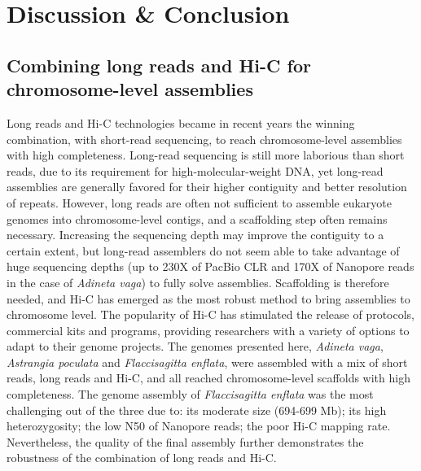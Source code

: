 \chapter{Discussion \& Conclusion}

\section{Combining long reads and Hi-C for chromosome-level assemblies}

Long reads and Hi-C technologies became in recent years the winning combination, with short-read sequencing, to reach chromosome-level assemblies with high completeness. Long-read sequencing is still more laborious than short reads, due to its requirement for high-molecular-weight DNA, yet long-read assemblies are generally favored for their higher contiguity and better resolution of repeats. However, long reads are often not sufficient to assemble eukaryote genomes into chromosome-level contigs, and a scaffolding step often remains necessary. Increasing the sequencing depth may improve the contiguity to a certain extent, but long-read assemblers do not seem able to take advantage of huge sequencing depths (up to 230X of PacBio CLR and 170X of Nanopore reads in the case of \textit{Adineta vaga}) to fully solve assemblies. Scaffolding is therefore needed, and Hi-C has emerged as the most robust method to bring assemblies to chromosome level. The popularity of Hi-C has stimulated the release of protocols, commercial kits and programs, providing researchers with a variety of options to adapt to their genome projects. The genomes presented here, \textit{Adineta vaga}, \textit{Astrangia poculata} and \textit{Flaccisagitta enflata}, were assembled with a mix of short reads, long reads and Hi-C, and all reached chromosome-level scaffolds with high completeness. The genome assembly of \textit{Flaccisagitta enflata} was the most challenging out of the three due to: its moderate size (694-699 Mb); its high heterozygosity; the low N50 of Nanopore reads; the poor Hi-C mapping rate. Nevertheless, the quality of the final assembly further demonstrates the robustness of the combination of long reads and Hi-C. \\


